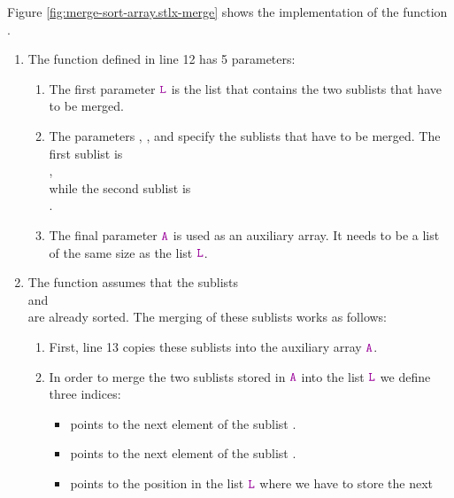 Figure \ref{fig:merge-sort-array.stlx-merge} shows the implementation of the function .
\begin{enumerate}
\item The function  defined in line 12 has 5 parameters: 
      \begin{enumerate}
      \item The first parameter $\mytt{L}$ is the list that contains the two sublists that have to be merged.
      \item The parameters , , and  specify the sublists
            that have to be merged.  The first sublist is 
            \\[0.2cm]
            \hspace*{1.3cm} 
            , 
            \\[0.2cm]
            while the second sublist is \\[0.2cm]
            \hspace*{1.3cm} 
            . 
      \item The final parameter $\mytt{A}$ is used as an auxiliary array.  It needs to be a list of the
            same size as the list $\mytt{L}$.
      \end{enumerate}
\item The function  assumes that the sublists 
      \\[0.2cm]
      \hspace*{1.3cm}
       \quad and \quad {} 
      \\[0.2cm]
      are already sorted.  The merging of these sublists works as follows:
      \begin{enumerate}
      \item First, line 13 copies these sublists into the auxiliary array $\mytt{A}$.
      \item In order to merge the two sublists stored in $\mytt{A}$ into the list $\mytt{L}$ we define
            three indices: 
            \begin{itemize}
            \item {} points to the next element of the sublist .
            \item {} points to the next element of the sublist .
            \item {} points to the position in the list $\mytt{L}$ where we have to store the next

\end{itemize}
\end{enumerate}
\end{enumerate}
